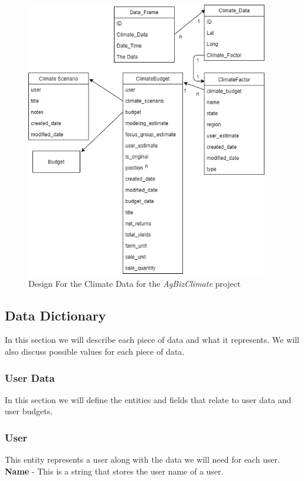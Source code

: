 \documentclass[onecolumn, draftclsnofoot,10pt, compsoc]{article}
\begin{document}
		\begin{figure}[htb]
			\begin{center}
				\includegraphics[width=300pt]{UMLDiagrams/ClimateData.jpg}
			\end{center}
			\caption{Design For the Climate Data for the \textit{AgBizClimate} project}
			\label{fig:CD1}
		\end{figure}


	\subsection{Data Dictionary}
		In this section we will describe each piece of data and what it represents. We will also discuss possible values for each piece of data.\\
		\subsubsection{User Data}
			In this section we will define the entities and fields that relate to user data and user budgets.\\
			\subsubsection{User}
				This entity represents a user along with the data we will need for each user.\\
				\textbf{Name} - This is a string that stores the user name of a user.\\
\end{document}
